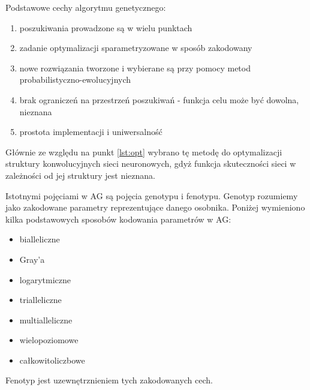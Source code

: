 Podstawowe cechy algorytmu genetycznego:
\begin{enumerate}
	\item poszukiwania prowadzone są w wielu punktach
	\item zadanie optymalizacji sparametryzowane w sposób zakodowany
	\item nowe rozwiązania tworzone i wybierane są przy pomocy metod probabilistyczno-ewolucyjnych
	\item brak ograniczeń na przestrzeń poszukiwań - funkcja celu może być dowolna, nieznana \label{lst:opt}
	\item prostota implementacji i uniwersalność
\end{enumerate}

Głównie ze względu na punkt \ref{lst:opt} wybrano tę metodę do optymalizacji struktury konwolucyjnych sieci neuronowych, gdyż funkcja skuteczności sieci w zależności od jej struktury jest nieznana.

Istotnymi pojęciami w AG są pojęcia genotypu i fenotypu.
Genotyp rozumiemy jako zakodowane parametry reprezentujące danego osobnika.
Poniżej wymieniono kilka podstawowych sposobów kodowania parametrów w AG:
\begin{itemize}
	\item bialleliczne
	\item Gray’a
	\item logarytmiczne
	\item trialleliczne
	\item multialleliczne
	\item wielopoziomowe
	\item całkowitoliczbowe
\end{itemize}
Fenotyp jest uzewnętrznieniem tych zakodowanych cech.

